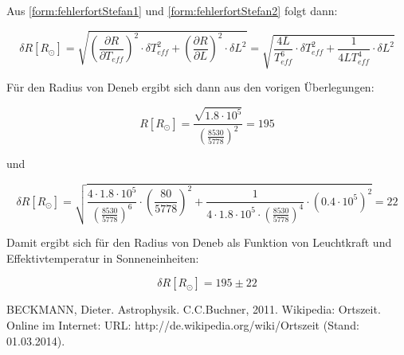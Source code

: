 \documentclass[titlepage]{scrartcl}
\begin{document}
Aus \eqref{form:fehlerfortStefan1} und \eqref{form:fehlerfortStefan2} folgt dann:

\begin{equation}
\delta R[R_{\odot}] = \sqrt{(\frac{\partial R}{\partial T_{eff}})^2 \cdot \delta T^2_{eff} + (\frac{\partial R}{\partial L})^2 \cdot \delta L^2} = \sqrt{\frac{4 L}{T^6_{eff}} \cdot \delta T^2_{eff} + \frac{1}{4 L T^4_{eff}} \cdot \delta L^2}
\end{equation}

Für den Radius von Deneb ergibt sich dann aus den vorigen Überlegungen:

\begin{equation}
R[R_{\odot}] = \frac{\sqrt{1.8 \cdot 10^5}} {(\frac{8530}{5778})^2} = 195
\end{equation}

und

\begin{equation}
\delta R[R_{\odot}] = \sqrt{\frac{4 \cdot 1.8 \cdot 10^5}{({\frac{8530}{5778}})^6} \cdot (\frac{80}{5778})^2 + \frac{1}{4 \cdot 1.8 \cdot 10^5 \cdot ({\frac{8530}{5778}})^4} \cdot (0.4 \cdot 10^5)^2} = 22
\end{equation}

Damit ergibt sich für den Radius von Deneb als Funktion von Leuchtkraft und Effektivtemperatur in Sonneneinheiten:

\begin{equation}
\delta R[R_{\odot}] = 195 \pm 22
\end{equation}

\newpage

\begin{thebibliography}{9}
 BECKMANN, Dieter. Astrophysik. C.C.Buchner, 2011.
 Wikipedia: Ortszeit. Online im Internet: URL: http://de.wikipedia.org/wiki/Ortszeit (Stand: 01.03.2014). 


\end{thebibliography}
\end{document}
